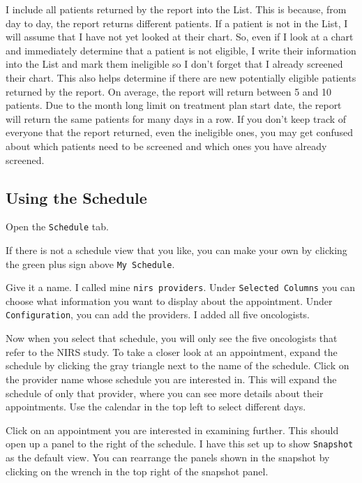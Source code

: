 \documentclass[
]{book}
\begin{document}
I include all patients returned by the report into the List. This is because, from day to day, the report returns different patients. If a patient is not in the List, I will assume that I have not yet looked at their chart. So, even if I look at a chart and immediately determine that a patient is not eligible, I write their information into the List and mark them ineligible so I don't forget that I already screened their chart. This also helps determine if there are new potentially eligible patients returned by the report. On average, the report will return between 5 and 10 patients. Due to the month long limit on treatment plan start date, the report will return the same patients for many days in a row. If you don't keep track of everyone that the report returned, even the ineligible ones, you may get confused about which patients need to be screened and which ones you have already screened.

\hypertarget{using-the-schedule}{%
\subsection{Using the Schedule}\label{using-the-schedule}}

Open the \texttt{Schedule} tab.

If there is not a schedule view that you like, you can make your own by clicking the green plus sign above \texttt{My\ Schedule}.

Give it a name. I called mine \texttt{nirs\ providers}. Under \texttt{Selected\ Columns} you can choose what information you want to display about the appointment. Under \texttt{Configuration}, you can add the providers. I added all five oncologists.

Now when you select that schedule, you will only see the five oncologists that refer to the NIRS study. To take a closer look at an appointment, expand the schedule by clicking the gray triangle next to the name of the schedule. Click on the provider name whose schedule you are interested in. This will expand the schedule of only that provider, where you can see more details about their appointments. Use the calendar in the top left to select different days.

Click on an appointment you are interested in examining further. This should open up a panel to the right of the schedule. I have this set up to show \texttt{Snapshot} as the default view. You can rearrange the panels shown in the snapshot by clicking on the wrench in the top right of the snapshot panel.
\end{document}

